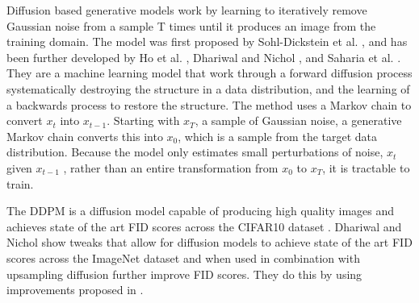 \documentclass{UoYCSproject}
\begin{document}
Diffusion based generative models work by learning to iteratively remove Gaussian noise from a sample T times until it produces an image from the training domain. The model was first proposed by Sohl-Dickstein et al. \cite{sohldickstein2015deep}, and has been further developed by Ho et al. \cite{ho2020denoising},  Dhariwal and Nichol \cite{dhariwal2021diffusion}, and Saharia et al. \cite{saharia2022palette}. They are a machine learning model that work through a forward diffusion process systematically destroying the structure in a data distribution, and the learning of a backwards process to restore the structure. The method uses a Markov chain to convert $ x_t $ into $ x_{t-1} $. Starting with $ x_T $, a sample of Gaussian noise, a generative Markov chain converts this into $ x_0 $, which is a sample from the target data distribution. Because the model only estimates small perturbations of noise, $ x_t $ given $ x_{t-1} $ , rather than an entire transformation from $ x_0 $ to $ x_T $, it is tractable to train. 

The DDPM is a diffusion model capable of producing high quality images and achieves state of the art FID scores across the CIFAR10 dataset \cite{ho2020denoising}. Dhariwal and Nichol \cite{dhariwal2021diffusion} show tweaks that allow for diffusion models to achieve state of the art FID scores across the ImageNet dataset and when used in combination with upsampling diffusion further improve FID scores. They do this by using improvements proposed in \cite{song2022denoising, nichol2021improved, song2021scorebased, brock2019large, karras2019stylebased}.


\end{document}
